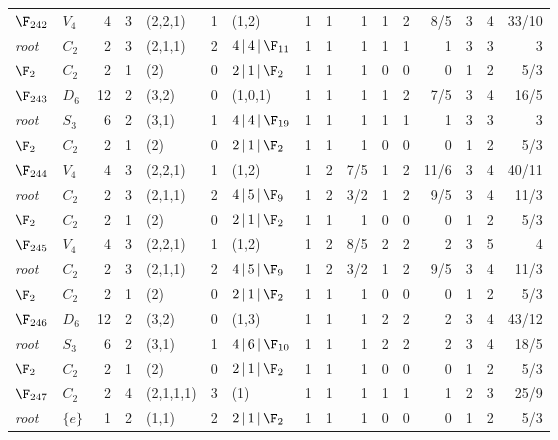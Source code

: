 \begin{landscape}
{\begin{longtable}{@{}l l r r l r l rrr rrr rrr@{}}
\addlinespace[3pt]
\textbf{$\F_{242}$} & $V_{4}$ & 4 & 3 & (2,2,1) & 1 & (1,2) & 1 & 1 & 1 & 1 & 2 & 8/5 & 3 & 4 & 33/10 \\
\quad\textit{root} & $C_{2}$ & 2 & 3 & (2,1,1) & 2 & $4\,|\,4\,|\,\F_{11}$ & 1 & 1 & 1 & 1 & 1 & 1 & 3 & 3 & 3 \\
\quad$\F_{2}$ & $C_{2}$ & 2 & 1 & (2) & 0 & $2\,|\,1\,|\,\F_{2}$ & 1 & 1 & 1 & 0 & 0 & 0 & 1 & 2 & 5/3 \\
\addlinespace[3pt]
\textbf{$\F_{243}$} & $D_{6}$ & 12 & 2 & (3,2) & 0 & (1,0,1) & 1 & 1 & 1 & 1 & 2 & 7/5 & 3 & 4 & 16/5 \\
\quad\textit{root} & $S_{3}$ & 6 & 2 & (3,1) & 1 & $4\,|\,4\,|\,\F_{19}$ & 1 & 1 & 1 & 1 & 1 & 1 & 3 & 3 & 3 \\
\quad$\F_{2}$ & $C_{2}$ & 2 & 1 & (2) & 0 & $2\,|\,1\,|\,\F_{2}$ & 1 & 1 & 1 & 0 & 0 & 0 & 1 & 2 & 5/3 \\
\addlinespace[3pt]
\textbf{$\F_{244}$} & $V_{4}$ & 4 & 3 & (2,2,1) & 1 & (1,2) & 1 & 2 & 7/5 & 1 & 2 & 11/6 & 3 & 4 & 40/11 \\
\quad\textit{root} & $C_{2}$ & 2 & 3 & (2,1,1) & 2 & $4\,|\,5\,|\,\F_{9}$ & 1 & 2 & 3/2 & 1 & 2 & 9/5 & 3 & 4 & 11/3 \\
\quad$\F_{2}$ & $C_{2}$ & 2 & 1 & (2) & 0 & $2\,|\,1\,|\,\F_{2}$ & 1 & 1 & 1 & 0 & 0 & 0 & 1 & 2 & 5/3 \\
\addlinespace[3pt]
\textbf{$\F_{245}$} & $V_{4}$ & 4 & 3 & (2,2,1) & 1 & (1,2) & 1 & 2 & 8/5 & 2 & 2 & 2 & 3 & 5 & 4 \\
\quad\textit{root} & $C_{2}$ & 2 & 3 & (2,1,1) & 2 & $4\,|\,5\,|\,\F_{9}$ & 1 & 2 & 3/2 & 1 & 2 & 9/5 & 3 & 4 & 11/3 \\
\quad$\F_{2}$ & $C_{2}$ & 2 & 1 & (2) & 0 & $2\,|\,1\,|\,\F_{2}$ & 1 & 1 & 1 & 0 & 0 & 0 & 1 & 2 & 5/3 \\
\addlinespace[3pt]
\textbf{$\F_{246}$} & $D_{6}$ & 12 & 2 & (3,2) & 0 & (1,3) & 1 & 1 & 1 & 2 & 2 & 2 & 3 & 4 & 43/12 \\
\quad\textit{root} & $S_{3}$ & 6 & 2 & (3,1) & 1 & $4\,|\,6\,|\,\F_{10}$ & 1 & 1 & 1 & 2 & 2 & 2 & 3 & 4 & 18/5 \\
\quad$\F_{2}$ & $C_{2}$ & 2 & 1 & (2) & 0 & $2\,|\,1\,|\,\F_{2}$ & 1 & 1 & 1 & 0 & 0 & 0 & 1 & 2 & 5/3 \\
\addlinespace[3pt]
\textbf{$\F_{247}$} & $C_{2}$ & 2 & 4 & (2,1,1,1) & 3 & (1) & 1 & 1 & 1 & 1 & 1 & 1 & 2 & 3 & 25/9 \\
\quad\textit{root} & $\{e\}$ & 1 & 2 & (1,1) & 2 & $2\,|\,1\,|\,\F_{2}$ & 1 & 1 & 1 & 0 & 0 & 0 & 1 & 2 & 5/3 \\

\end{longtable}}
\end{landscape}
